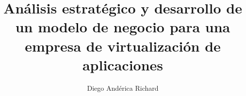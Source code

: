 \title{Análisis estratégico y desarrollo de un modelo de negocio para una empresa de virtualización de aplicaciones}
\author{Diego Andérica Richard}{}




\phone{}





